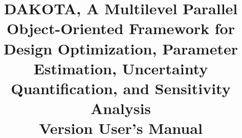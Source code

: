 \documentclass[ps2pdf,11pt,report]{SANDreport}
\title{DAKOTA, A Multilevel Parallel Object-Oriented Framework for 
Design Optimization, Parameter Estimation, Uncertainty Quantification, 
and Sensitivity Analysis\\\vspace{5mm}Version \DakotaVersion\space User's Manual}
\author{\DakotaAuthorLong}
\begin{document}

\maketitle

\begin{abstract}
\DakotaAbstractShared
\DakotaAbstractUsers
\end{abstract}


\SANDmain 






\begin{SANDdistribution}[NM]





\end{SANDdistribution}

\end{document}
